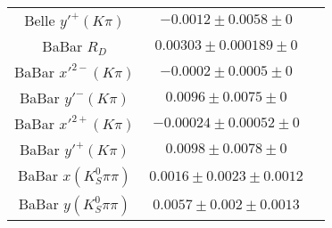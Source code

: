 \begin{table}[htdp]
\begin{center}
\begin{tabular}{|c|c|c|}
Belle $y'^+(K\pi)$ & $-0.0012\pm0.0058\pm0$ & \\
BaBar $ R_D$ & $0.00303\pm0.000189\pm0$ & \\
BaBar $ x'^{2-}(K\pi)$ & $-0.0002\pm0.0005\pm0$ & \\
BaBar $y'^-(K\pi)$ & $0.0096\pm0.0075\pm0$ & \\
BaBar $ x'^{2+}(K\pi)$ & $-0.00024\pm0.00052\pm0$ & \\
BaBar $y'^+(K\pi)$ & $0.0098\pm0.0078\pm0$ & \\
BaBar $x(K_S^0\pi\pi)$ & $0.0016\pm0.0023\pm0.0012$ & \\
BaBar $y(K_S^0\pi\pi)$ & $0.0057\pm0.002\pm0.0013$ & \\
\hline
\end{tabular}
\end{center}
\label{table:nodcpv_inputs}
\end{table}
